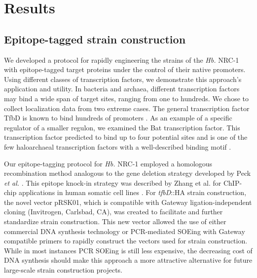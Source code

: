 \section{Results}

\subsection{Epitope-tagged strain construction}

We developed a protocol for rapidly engineering the strains of the {\em Hb.} NRC-1 with epitope-tagged target proteins under the control of their native promoters. Using different classes of transcription factors, we demonstrate this approach's application and utility. In bacteria and archaea, different transcription factors may bind a wide span of target sites, ranging from one to hundreds. We chose to collect localization data from two extreme cases. The general transcription factor TfbD is known to bind hundreds of promoters \cite{facciotti_general_2007}. As an example of a specific regulator of a smaller regulon, we examined the Bat transcription factor. This transcription factor predicted to bind up to four potential sites and is one of the few haloarchaeal transcription factors with a well-described binding motif \cite{baliga_genomic_2001}.

Our epitope-tagging protocol for {\em Hb.} NRC-1 employed a homologous recombination method analogous to the gene deletion strategy developed by Peck {\em et al.} \cite{peck_homologous_2000}. This epitope knock-in strategy was described by Zhang et al. for ChIP-chip applications in human somatic cell lines \cite{zhang2008epitope}. For {\em tfbD}::HA strain construction, the novel vector pRSK01, which is compatible with Gateway ligation-independent cloning (Invitrogen, Carlsbad, CA), was created to facilitate and further standardize strain construction. This new vector allowed the use of either commercial DNA synthesis technology or PCR-mediated SOEing \cite{horton1989engineering} with Gateway compatible primers to rapidly construct the vectors used for strain construction. While in most instances PCR SOEing is still less expensive, the decreasing cost of DNA synthesis should make this approach a more attractive alternative for future large-scale strain construction projects.

